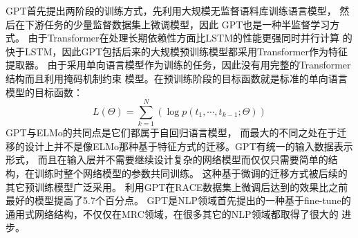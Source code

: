 GPT首先提出两阶段的训练方式，先利用大规模无监督语料库训练语言模型，
然后在下游任务的少量监督数据集上微调模型，因此
GPT也是一种半监督学习方式。
由于Transformer在处理长期依赖性方面比LSTM的性能更强同时并行计算
的快于LSTM，因此GPT包括后来的大规模预训练模型都采用Transformer作为特征提取器。
由于采用单向语言模型作为训练的任务，因此没有用完整的Transformer结构而且利用掩码机制约束
模型。在预训练阶段的目标函数就是标准的单向语言模型的目标函数：
\begin{equation}
    L(\Theta)=\sum_{k=1}^{N}(\log p(t_1,\cdots,t_{k-1};\Theta))
\end{equation}
GPT与ELMo的共同点是它们都属于自回归语言模型，
而最大的不同之处在于迁移的设计上并不是像ELMo那种基于特征方式的迁移。GPT有统一的输入数据表示形式，
而且在输入层并不需要继续设计复杂的网络模型而仅仅只需要简单的结构，在训练时整个网络模型的参数共同训练。
这种基于微调的迁移方式被后续的其它预训练模型广泛采用。
利用GPT在RACE数据集上微调后达到的效果比之前最好的模型提高了5.7个百分点。
GPT是NLP领域首先提出的一种基于fine-tune的通用式网络结构，不仅仅在MRC领域，在很多其它的NLP领域都取得了很大的
进步。
                
        


